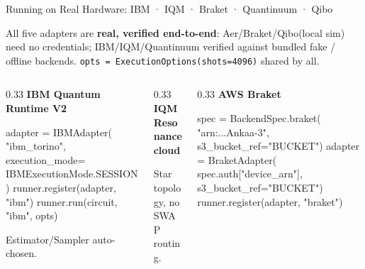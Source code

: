 \documentclass[
  ignorenonframetext,
  aspectratio=169,
]{beamer}
\newenvironment{Shaded}{\begin{snugshade}}{\end{snugshade}}
\newcommand{\CommentTok}[1]{\textcolor[rgb]{0.48,0.49,0.49}{#1}}
\newcommand{\NormalTok}[1]{\textcolor[rgb]{0.81,0.81,0.76}{#1}}
\newcommand{\OperatorTok}[1]{\textcolor[rgb]{0.81,0.81,0.76}{#1}}
\newcommand{\StringTok}[1]{\textcolor[rgb]{0.96,0.31,0.31}{#1}}
\begin{document}
\begin{frame}[fragile]{Running on Real Hardware: IBM · IQM · Braket ·
Quantinuum · Qibo}
\label{running-on-real-hardware-ibm-iqm-braket-quantinuum-qibo}
\scriptsize

All five adapters are \textbf{real, verified end-to-end}:
Aer/Braket/Qibo(local sim) need no credentials; IBM/IQM/Quantinuum
verified against bundled fake / offline backends.
\texttt{opts\ =\ ExecutionOptions(shots=4096)} shared by all.

\begin{columns}[T]
\begin{column}{0.33\textwidth}
\textbf{IBM Quantum Runtime V2}

\begin{Shaded}
\begin{Highlighting}[]
\NormalTok{adapter }\OperatorTok{=}\NormalTok{ IBMAdapter(}
    \StringTok{"ibm\_torino"}\NormalTok{,}
\NormalTok{    execution\_mode}\OperatorTok{=}
\NormalTok{        IBMExecutionMode.SESSION)}
\NormalTok{runner.register(adapter, }\StringTok{"ibm"}\NormalTok{)}
\NormalTok{runner.run(circuit, }\StringTok{"ibm"}\NormalTok{, opts)}
\end{Highlighting}
\end{Shaded}

Estimator/Sampler auto-chosen.
\end{column}

\begin{column}{0.33\textwidth}
\textbf{IQM Resonance cloud}

\begin{Shaded}
\end{Shaded}

Star topology, no SWAP routing.
\end{column}

\begin{column}{0.33\textwidth}
\textbf{AWS Braket}

\begin{Shaded}
\begin{Highlighting}[]
\NormalTok{spec }\OperatorTok{=}\NormalTok{ BackendSpec.braket(}
    \StringTok{"arn:...Ankaa{-}3"}\NormalTok{,}
\NormalTok{    s3\_bucket\_ref}\OperatorTok{=}\StringTok{"BUCKET"}\NormalTok{)}
\NormalTok{adapter }\OperatorTok{=}\NormalTok{ BraketAdapter(}
\NormalTok{    spec.auth[}\StringTok{"device\_arn"}\NormalTok{],}
\NormalTok{    s3\_bucket\_ref}\OperatorTok{=}\StringTok{"BUCKET"}\NormalTok{)}
\NormalTok{runner.register(adapter, }\StringTok{"braket"}\NormalTok{)}
\end{Highlighting}
\end{Shaded}


\end{column}
\end{columns}
\end{frame}
\end{document}
